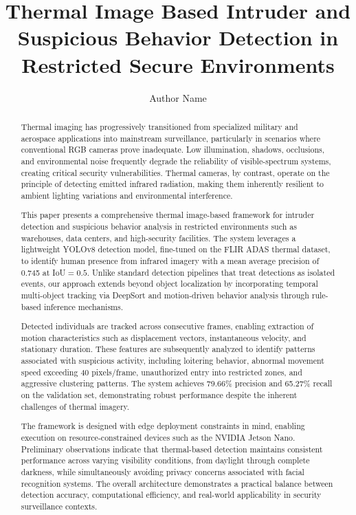 \documentclass[conference]{IEEEtran}
\title{Thermal Image Based Intruder and Suspicious Behavior Detection in Restricted Secure Environments}
\author{Author Name}
\begin{document}
\maketitle

\begin{abstract}

Thermal imaging has progressively transitioned from specialized military and aerospace applications into mainstream surveillance, particularly in scenarios where conventional RGB cameras prove inadequate. Low illumination, shadows, occlusions, and environmental noise frequently degrade the reliability of visible-spectrum systems, creating critical security vulnerabilities. Thermal cameras, by contrast, operate on the principle of detecting emitted infrared radiation, making them inherently resilient to ambient lighting variations and environmental interference.

This paper presents a comprehensive thermal image-based framework for intruder detection and suspicious behavior analysis in restricted environments such as warehouses, data centers, and high-security facilities. The system leverages a lightweight YOLOv8 detection model, fine-tuned on the FLIR ADAS thermal dataset, to identify human presence from infrared imagery with a mean average precision of 0.745 at IoU$=0.5$. Unlike standard detection pipelines that treat detections as isolated events, our approach extends beyond object localization by incorporating temporal multi-object tracking via DeepSort and motion-driven behavior analysis through rule-based inference mechanisms.

Detected individuals are tracked across consecutive frames, enabling extraction of motion characteristics such as displacement vectors, instantaneous velocity, and stationary duration. These features are subsequently analyzed to identify patterns associated with suspicious activity, including loitering behavior, abnormal movement speed exceeding 40 pixels/frame, unauthorized entry into restricted zones, and aggressive clustering patterns. The system achieves 79.66\% precision and 65.27\% recall on the validation set, demonstrating robust performance despite the inherent challenges of thermal imagery.

The framework is designed with edge deployment constraints in mind, enabling execution on resource-constrained devices such as the NVIDIA Jetson Nano. Preliminary observations indicate that thermal-based detection maintains consistent performance across varying visibility conditions, from daylight through complete darkness, while simultaneously avoiding privacy concerns associated with facial recognition systems. The overall architecture demonstrates a practical balance between detection accuracy, computational efficiency, and real-world applicability in security surveillance contexts.

\end{abstract}
\end{document}
